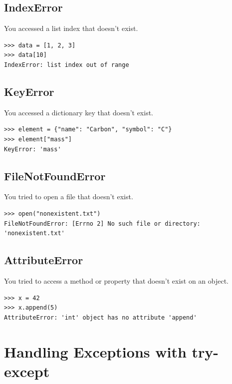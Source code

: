 \subsection{IndexError}

You accessed a list index that doesn't exist.

\begin{lstlisting}
>>> data = [1, 2, 3]
>>> data[10]
IndexError: list index out of range
\end{lstlisting}

\subsection{KeyError}

You accessed a dictionary key that doesn't exist.

\begin{lstlisting}
>>> element = {"name": "Carbon", "symbol": "C"}
>>> element["mass"]
KeyError: 'mass'
\end{lstlisting}

\subsection{FileNotFoundError}

You tried to open a file that doesn't exist.

\begin{lstlisting}
>>> open("nonexistent.txt")
FileNotFoundError: [Errno 2] No such file or directory: 'nonexistent.txt'
\end{lstlisting}

\subsection{AttributeError}

You tried to access a method or property that doesn't exist on an object.

\begin{lstlisting}
>>> x = 42
>>> x.append(5)
AttributeError: 'int' object has no attribute 'append'
\end{lstlisting}

\section{Handling Exceptions with try-except}
\label{sec:try-except}

